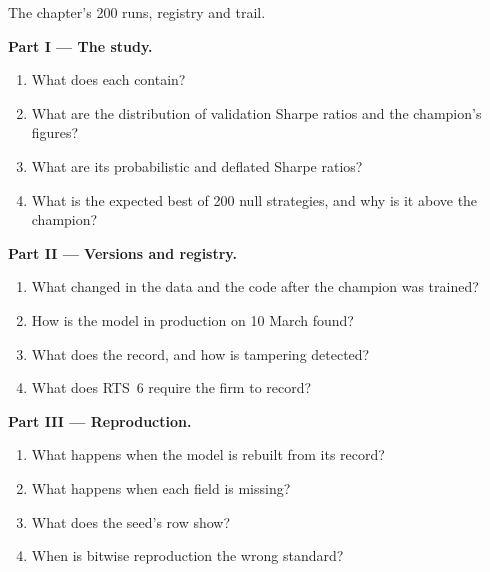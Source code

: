 \begin{problem}\label{pb:ml:experiment-tracking-and-reproducibility:1}
The chapter's 200 runs, registry and trail.

\medskip\noindent\textbf{Part I --- The study.}
\begin{enumerate}
\item What does each  contain?
\item What are the distribution of validation Sharpe ratios and the champion's figures?
\item What are its probabilistic and deflated Sharpe ratios?
\item What is the expected best of 200 null strategies, and why is it above the champion?
\end{enumerate}

\medskip\noindent\textbf{Part II --- Versions and registry.}
\begin{enumerate}[resume]
\item What changed in the data and the code after the champion was trained?
\item How is the model in production on 10 March found?
\item What does the  record, and how is tampering detected?
\item What does RTS~6 require the firm to record?
\end{enumerate}

\medskip\noindent\textbf{Part III --- Reproduction.}
\begin{enumerate}[resume]
\item What happens when the model is rebuilt from its record?
\item What happens when each field is missing?
\item What does the seed's row show?
\item When is bitwise reproduction the wrong standard?
\end{enumerate}


\end{problem}
